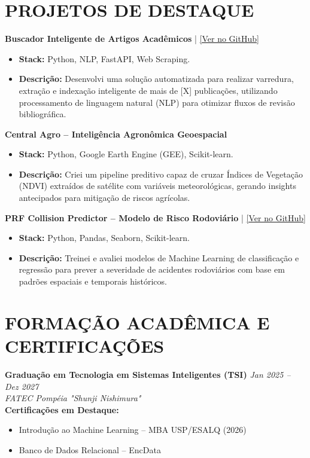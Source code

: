 \documentclass[11pt,a4paper]{article}
\begin{document}
\vspace{0.2cm}
\section*{PROJETOS DE DESTAQUE}
\textbf{Buscador Inteligente de Artigos Acadêmicos} | \href{https://github.com/marciomazega}{[Ver no GitHub]}
\begin{itemize}
    \item \textbf{Stack:} Python, NLP, FastAPI, Web Scraping.
    \item \textbf{Descrição:} Desenvolvi uma solução automatizada para realizar varredura, extração e indexação inteligente de mais de [X] publicações, utilizando processamento de linguagem natural (NLP) para otimizar fluxos de revisão bibliográfica.
\end{itemize}

\textbf{Central Agro -- Inteligência Agronômica Geoespacial}
\begin{itemize}
    \item \textbf{Stack:} Python, Google Earth Engine (GEE), Scikit-learn.
    \item \textbf{Descrição:} Criei um pipeline preditivo capaz de cruzar Índices de Vegetação (NDVI) extraídos de satélite com variáveis meteorológicas, gerando insights antecipados para mitigação de riscos agrícolas.
\end{itemize}

\textbf{PRF Collision Predictor -- Modelo de Risco Rodoviário} | \href{https://github.com/marciomazega}{[Ver no GitHub]}
\begin{itemize}
    \item \textbf{Stack:} Python, Pandas, Seaborn, Scikit-learn.
    \item \textbf{Descrição:} Treinei e avaliei modelos de Machine Learning de classificação e regressão para prever a severidade de acidentes rodoviários com base em padrões espaciais e temporais históricos.
\end{itemize}

\vspace{0.2cm}
\section*{FORMAÇÃO ACADÊMICA E CERTIFICAÇÕES}
\textbf{Graduação em Tecnologia em Sistemas Inteligentes (TSI)} \hfill \textit{Jan 2025 -- Dez 2027} \\
\textit{FATEC Pompéia "Shunji Nishimura"} \\
\vspace{0.1cm}
\textbf{Certificações em Destaque:}
\begin{itemize}
    \item Introdução ao Machine Learning -- MBA USP/ESALQ (2026)
    \item Banco de Dados Relacional -- EncData
\end{itemize}
\end{document}
